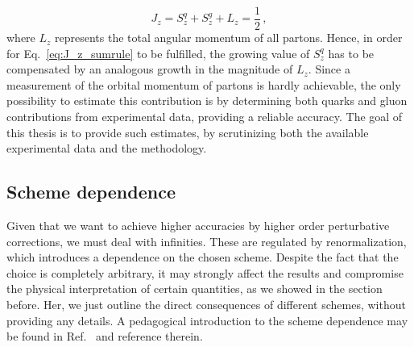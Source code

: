 \begin{equation}
  J_{z} = S_{z}^{q} + S_{z}^{g} + L_z = \frac{1}{2} \,, 
  \label{eq:J_z_sumrule}
\end{equation} 
where $L_z$ represents the total angular momentum of all partons. Hence, in order for Eq.~\eqref{eq:J_z_sumrule} to be fulfilled, the growing value of $S_{z}^{q}$ has to be compensated by an analogous growth in the magnitude of $L_{z}$. Since a measurement of the orbital momentum of partons is hardly achievable, the only possibility to estimate this contribution is by determining both quarks and gluon contributions from experimental data, providing a reliable accuracy. The goal of this thesis is to provide such estimates, by scrutinizing both the available experimental data and the methodology.

\subsection{Scheme dependence}
Given that we want to achieve higher accuracies by higher order perturbative corrections, we must deal with infinities. These are regulated by renormalization, which introduces a dependence on the chosen scheme. Despite the fact that the choice is completely arbitrary, it may strongly affect the results and compromise the physical interpretation of certain quantities, as we showed in the section before. Her, we just outline the direct consequences of different schemes, without providing any details. A pedagogical introduction to the scheme dependence may be found in Ref.~\cite{leader_2001} and reference therein. 
